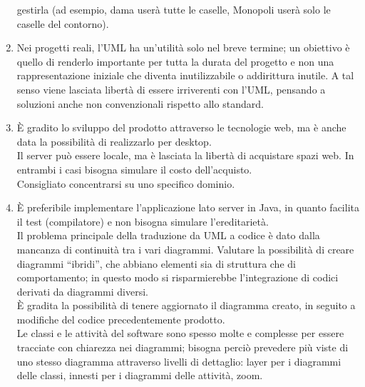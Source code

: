 \documentclass[../AnalisiDeiRequisiti.tex]{subfiles}
\begin{document}
\begin{enumerate}
			gestirla (ad esempio, dama userà tutte le caselle, Monopoli userà solo
			le caselle del contorno).
			\item Nei progetti reali, l'UML ha un'utilità solo nel breve termine;
			un obiettivo è quello di renderlo importante per tutta la durata del
			progetto e non una rappresentazione iniziale che diventa inutilizzabile
			o addirittura inutile.
			A tal senso viene lasciata libertà di essere irriverenti con l'UML,
			pensando a soluzioni anche non convenzionali rispetto allo standard.
			\item È gradito lo sviluppo del prodotto attraverso le tecnologie web,
			ma è anche data la possibilità di realizzarlo per desktop.\\
			Il server può essere locale, ma è lasciata la libertà di acquistare
			spazi web. In entrambi i casi bisogna simulare il costo dell'acquisto.\\
			Consigliato concentrarsi su uno specifico dominio.
			\item È preferibile implementare l'applicazione lato server in Java, in
			quanto facilita il test (compilatore) e non bisogna simulare
			l'ereditarietà.\\
			Il problema principale della traduzione da UML a codice è dato dalla
			mancanza di continuità tra i vari diagrammi. Valutare la possibilità di
			creare diagrammi ``ibridi'', che abbiano elementi sia di struttura che
			di comportamento; in questo modo si risparmierebbe l'integrazione di
			codici derivati da diagrammi diversi.\\
			È gradita la possibilità di tenere aggiornato il diagramma creato, in
			seguito a modifiche del codice precedentemente prodotto.\\
			Le classi e le attività del software sono spesso molte e complesse per
			essere tracciate con chiarezza nei diagrammi; bisogna perciò prevedere
			più viste di uno stesso diagramma attraverso livelli di dettaglio: layer
			per i diagrammi delle classi, innesti per i diagrammi delle
			attività, zoom.	
		\end{enumerate}
\end{document}
